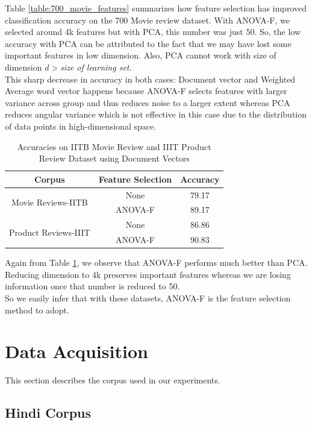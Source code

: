 \documentclass[11pt,a4paper]{article}
\begin{document}
Table \ref{table:700_movie_features} summarizes how feature selection has improved classification accuracy on the 700 Movie review dataset. With ANOVA-F, we selected around 4k features but with PCA, this number was just 50. So, the low accuracy with PCA can be attributed to the fact that we may have lost some important features in low dimension. Also, PCA cannot work with size of dimension $d>$\emph{size of learning set}.\\
This sharp decrease in accuracy in both cases: Document vector and Weighted Average word vector happens because ANOVA-F selects features with larger variance across group and thus reduces noise to a larger extent whereas PCA reduces angular variance which is not effective in this case due to the distribution of data points in high-dimensional space.

\begin{table}[h!]
\centering
\begin{tabular}{|c|c|c|}
\hline
\textbf{Corpus} & \textbf{Feature Selection} & \textbf{Accuracy} \\ \hline
\multirow{2}{*}{Movie Reviews-IITB}   & None    & 79.17 \\ \cline{2-3} 
                                      & ANOVA-F & 89.17 \\ \hline
\multirow{2}{*}{Product Reviews-IIIT} & None    & 86.86 \\ \cline{2-3} 
                                      & ANOVA-F & 90.83 \\ \hline
\end{tabular}
\caption {Accuracies on IITB Movie Review and IIIT Product Review Dataset using Document Vectors}
\label{table:review_features}
\end{table}
Again from Table \ref{table:review_features}, we observe that ANOVA-F performs much better than PCA. Reducing dimension to 4k preserves important features whereas we are losing information once that number is reduced to 50.\\
So we easily infer that with these datasets, ANOVA-F is the feature selection method to adopt.


\section{Data Acquisition}
\label{sec:data}
This section describes the corpus used in our experiments.

\subsection{Hindi Corpus}
\label{hindi_corpus}
\end{document}
